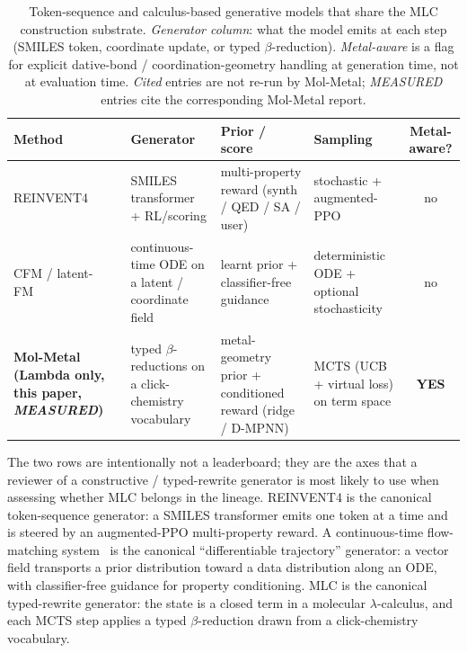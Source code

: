 \begin{table}[t]
\centering
\small
\caption{Token-sequence and calculus-based generative models that
share the MLC construction substrate. \emph{Generator column}: what
the model emits at each step (SMILES token, coordinate update, or
typed $\beta$-reduction). \emph{Metal-aware} is a flag for explicit
dative-bond / coordination-geometry handling at generation time, not
at evaluation time. \emph{Cited} entries are not re-run by Mol-Metal;
\emph{MEASURED} entries cite the corresponding Mol-Metal report.}
\label{tab:seqgen-comparison}
\vspace{2pt}
\begin{tabular}{p{3.4cm}p{3.6cm}p{3.2cm}p{2.4cm}c}
\hline
\textbf{Method} & \textbf{Generator} & \textbf{Prior / score} & \textbf{Sampling} & \textbf{Metal-aware?} \\
\hline
REINVENT4~\cite{footnote:reinvent4} & SMILES transformer + RL/scoring & multi-property reward (synth / QED / SA / user) & stochastic + augmented-PPO & no \\
CFM / latent-FM~\cite{footnote:cfm_lipman} & continuous-time ODE on a latent / coordinate field & learnt prior + classifier-free guidance & deterministic ODE + optional stochasticity & no \\
\hline
\textbf{Mol-Metal (Lambda only, this paper, \emph{MEASURED})} & typed $\beta$-reductions on a click-chemistry vocabulary & metal-geometry prior + conditioned reward (ridge / D-MPNN) & MCTS (UCB + virtual loss) on term space & \textbf{YES} \\
\hline
\end{tabular}
\end{table}

The two rows are intentionally not a leaderboard; they are the
axes that a reviewer of a constructive / typed-rewrite generator is
most likely to use when assessing whether MLC belongs in the lineage.
REINVENT4 is the canonical token-sequence generator: a SMILES
transformer emits one token at a time and is steered by an
augmented-PPO multi-property reward. A continuous-time
flow-matching system~\cite{footnote:cfm_lipman} is the canonical
``differentiable trajectory'' generator: a vector field transports a
prior distribution toward a data distribution along an ODE, with
classifier-free guidance for property conditioning. MLC is the
canonical typed-rewrite generator: the state is a closed term in a
molecular $\lambda$-calculus, and each MCTS step applies a typed
$\beta$-reduction drawn from a click-chemistry vocabulary.

